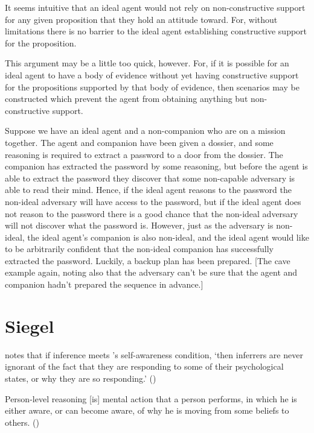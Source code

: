 \documentclass[10pt]{article}
\begin{document}
It seems intuitive that an ideal agent would not rely on non-constructive support for any given proposition that they hold an attitude toward.
For, without limitations there is no barrier to the ideal agent establishing constructive support for the proposition.

This argument may be a little too quick, however.
For, if it is possible for an ideal agent to have a body of evidence without yet having constructive support for the propositions supported by that body of evidence, then scenarios may be constructed which prevent the agent from obtaining anything but non-constructive support.

\begin{scenario}[Secrets]
  Suppose we have an ideal agent and a non-companion who are on a mission together.
  The agent and companion have been given a dossier, and some reasoning is required to extract a password to a door from the dossier.
  The companion has extracted the password by some reasoning, but before the agent is able to extract the password they discover that some non-capable adversary is able to read their mind.
  Hence, if the ideal agent reasons to the password the non-ideal adversary will have access to the password, but if the ideal agent does not reason to the password there is a good chance that the non-ideal adversary will not discover what the password is.
  However, just as the adversary is non-ideal, the ideal agent's companion is also non-ideal, and the ideal agent would like to be arbitrarily confident that the non-ideal companion has successfully extracted the password.
  Luckily, a backup plan has been prepared.
  [The cave example again, noting also that the adversary can't be sure that the agent and companion hadn't prepared the sequence in advance.]
\end{scenario}


\section{Siegel}
\label{sec:siegel}

\citeauthor{Siegel:2019aa} notes that if inference meets \citeauthor{Boghossian:2014aa}'s self-awareness condition, `then inferrers are never ignorant of the fact that they are responding to some of their psychological states, or why they are so responding.' (\citeyear[6]{Siegel:2019aa})

\begin{description}[font=\bfseries, leftmargin=.75cm, style=nextline]
\item[Self-awareness condition] Person-level reasoning [is] mental action that a person performs, in which he is either aware, or can become aware, of why he is moving from some beliefs to others.\nolinebreak
  \mbox{}\hfill\mbox{(\citeyear[16]{Boghossian:2014aa})}
\end{description}
\end{document}
